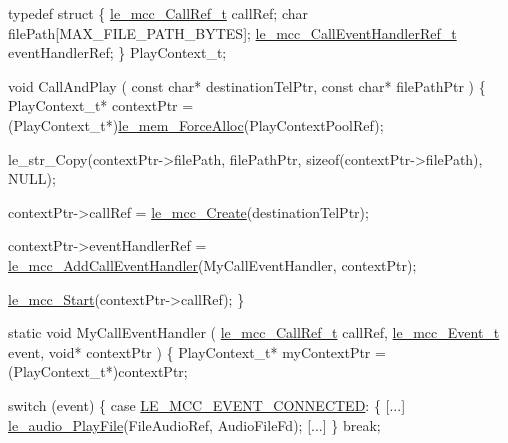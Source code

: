\begin{DoxyCode}
\textcolor{keyword}{typedef} \textcolor{keyword}{struct}
\{
    \hyperlink{le__mcc__interface_8h_a8ae6dac3ca12854884d63e17d5388a7a}{le\_mcc\_CallRef\_t}             callRef;
    \textcolor{keywordtype}{char}                         filePath[MAX\_FILE\_PATH\_BYTES];
    \hyperlink{le__mcc__interface_8h_a0bb9fd4ec67450a267bc372bf9a90cb9}{le\_mcc\_CallEventHandlerRef\_t} eventHandlerRef;
\}
PlayContext\_t;

\textcolor{keywordtype}{void} CallAndPlay
(
    \textcolor{keyword}{const} \textcolor{keywordtype}{char}* destinationTelPtr,
    \textcolor{keyword}{const} \textcolor{keywordtype}{char}* filePathPtr
)
\{
    PlayContext\_t* contextPtr = (PlayContext\_t*)\hyperlink{le__mem_8h_af7c289c73d4182835a26a9099f3db359}{le\_mem\_ForceAlloc}(PlayContextPoolRef);

    le\_str\_Copy(contextPtr->filePath, filePathPtr, \textcolor{keyword}{sizeof}(contextPtr->filePath), NULL);

    contextPtr->callRef = \hyperlink{le__mcc__interface_8h_aeee65430506230b5744701d08ff8dac4}{le\_mcc\_Create}(destinationTelPtr);

    contextPtr->eventHandlerRef = \hyperlink{le__mcc__interface_8h_ab826cf4b9e3911e659a90d483081e7fe}{le\_mcc\_AddCallEventHandler}(MyCallEventHandler,
                                                                  contextPtr);

    \hyperlink{le__mcc__interface_8h_a72a32869bb23864b3e86c606368bed70}{le\_mcc\_Start}(contextPtr->callRef);
\}


\textcolor{keyword}{static} \textcolor{keywordtype}{void} MyCallEventHandler
(
    \hyperlink{le__mcc__interface_8h_a8ae6dac3ca12854884d63e17d5388a7a}{le\_mcc\_CallRef\_t} callRef,
    \hyperlink{le__mcc__interface_8h_aefc4679ffa76d0e04c578572c22f06cf}{le\_mcc\_Event\_t}   event,
    \textcolor{keywordtype}{void}*            contextPtr
)
\{
    PlayContext\_t*      myContextPtr = (PlayContext\_t*)contextPtr;

    \textcolor{keywordflow}{switch} (event)
    \{
        \textcolor{keywordflow}{case} \hyperlink{le__mcc__interface_8h_aefc4679ffa76d0e04c578572c22f06cfa86702531207c50314b10ae3278c7ca0d}{LE\_MCC\_EVENT\_CONNECTED}:
            \{
                 [...]
                 \hyperlink{le__audio__interface_8h_aea2c5d0b394cfab87503639c534300c9}{le\_audio\_PlayFile}(FileAudioRef, AudioFileFd);
                 [...]
            \}
            \textcolor{keywordflow}{break};


\end{DoxyCode}
